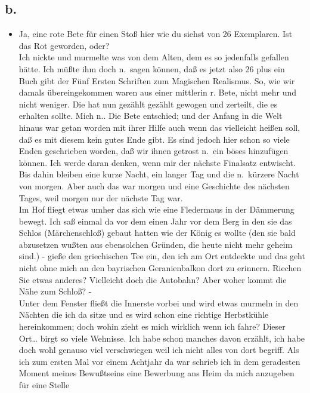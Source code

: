 \documentclass[
]{article}
\author{}
\date{\vspace{-2.5em}}
\providecommand{\tightlist}{%
  \setlength{\itemsep}{0pt}\setlength{\parskip}{0pt}}
\begin{document}
\subsection{b.}\label{b.}

\begin{itemize}
\tightlist
\item
  Ja, eine rote Bete für einen Stoß hier wie du siehst von 26
  Exemplaren. Ist das Rot geworden, oder?\\
  Ich nickte und murmelte was von dem Alten, dem es so jedenfalls
  gefallen hätte. Ich müßte ihm doch n.~sagen können, daß es jetzt also
  26 plus ein Buch gibt der Fünf Ersten Schriften zum Magischen
  Realismus. So, wie wir damals übereingekommen waren aus einer
  mittlerin r. Bete, nicht mehr und nicht weniger. Die hat nun gezählt
  gezählt gewogen und zerteilt, die es erhalten sollte. Mich n.. Die
  Bete entschied; und der Anfang in die Welt hinaus war getan worden mit
  ihrer Hilfe auch wenn das vielleicht heißen soll, daß es mit diesem
  kein gutes Ende gibt. Es sind jedoch hier schon so viele Enden
  geschrieben worden, daß wir ihnen getrost n.~ein böses hinzufügen
  können. Ich werde daran denken, wenn mir der nächste Finalsatz
  entwischt. Bis dahin bleiben eine kurze Nacht, ein langer Tag und die
  n.~kürzere Nacht von morgen. Aber auch das war morgen und eine
  Geschichte des nächsten Tages, weil morgen nur der nächste Tag war.\\
  Im Hof fliegt etwas umher das sich wie eine Fledermaus in der
  Dämmerung bewegt. Ich saß einmal da vor dem einen Jahr vor dem Berg in
  den sie das Schlos (Märchenschloß) gebaut hatten wie der König es
  wollte (den sie bald abzusetzen wußten aus ebensolchen Gründen, die
  heute nicht mehr geheim sind.) - gieße den griechischen Tee ein, den
  ich am Ort entdeckte und das geht nicht ohne mich an den bayrischen
  Geranienbalkon dort zu erinnern. Riechen Sie etwas anderes? Vielleicht
  doch die Autobahn? Aber woher kommt die Nähe zum Schloß? -\\
  Unter dem Fenster fließt die Innerste vorbei und wird etwas murmeln in
  den Nächten die ich da sitze und es wird schon eine richtige
  Herbstkühle hereinkommen; doch wohin zieht es mich wirklich wenn ich
  fahre? Dieser Ort\ldots{} birgt so viele Wehnisse. Ich habe schon
  manches davon erzählt, ich habe doch wohl genauso viel verschwiegen
  weil ich nicht alles von dort begriff. Als ich zum ersten Mal vor
  einem Achtjahr da war schrieb ich in dem geradesten Moment meines
  Bewußtseins eine Bewerbung ans Heim da mich anzugeben für eine Stelle

\end{itemize}
\end{document}
